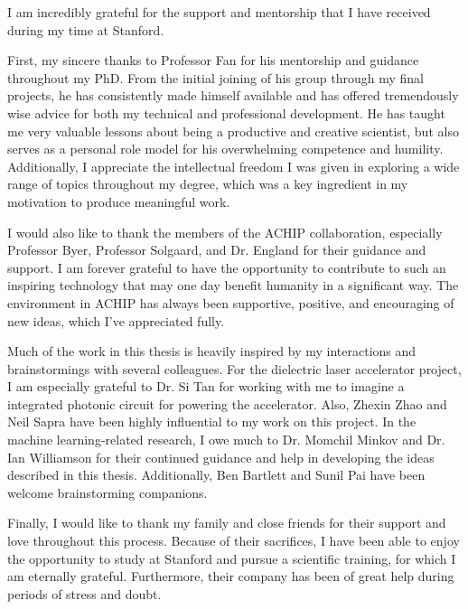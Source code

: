 I am incredibly grateful for the support and mentorship that I have received during my time at Stanford.  

First, my sincere thanks to Professor Fan for his mentorship and guidance throughout my PhD.  From the initial joining of his group through my final projects, he has consistently made himself available and has offered tremendously wise advice for both my technical and professional development.  He has taught me very valuable lessons about being a productive and creative scientist, but also serves as a personal role model for his overwhelming competence and humility.  Additionally, I appreciate the intellectual freedom I was given in exploring a wide range of topics throughout my degree, which was a key ingredient in my motivation to produce meaningful work.

I would also like to thank the members of the ACHIP collaboration, especially Professor Byer, Professor Solgaard, and Dr. England for their guidance and support.  I am forever grateful to have the opportunity to contribute to such an inspiring technology that may one day benefit humanity in a significant way.  The environment in ACHIP has always been supportive, positive, and encouraging of new ideas, which I've appreciated fully.

Much of the work in this thesis is heavily inspired by my interactions and brainstormings with several colleagues.  For the dielectric laser accelerator project, I am especially grateful to Dr. Si Tan for working with me to imagine a integrated photonic circuit for powering the accelerator.  
Also, Zhexin Zhao and Neil Sapra have been highly influential to my work on this project.  In the machine learning-related research, I owe much to Dr. Momchil Minkov and Dr. Ian Williamson for their continued guidance and help in developing the ideas described in this thesis.  Additionally, Ben Bartlett and Sunil Pai have been welcome brainstorming companions.

Finally, I would like to thank my family and close friends for their support and love throughout this process.  Because of their sacrifices, I have been able to enjoy the opportunity to study at Stanford and pursue a scientific training, for which I am eternally grateful.  Furthermore, their company has been of great help during periods of stress and doubt.
